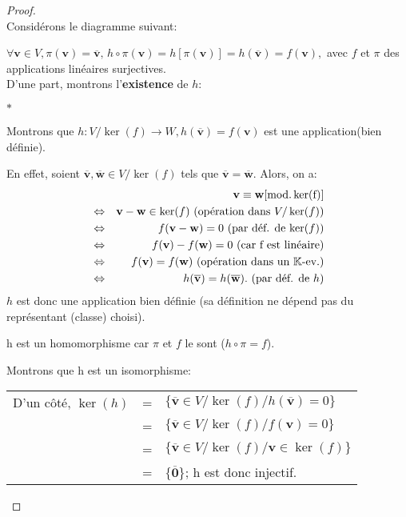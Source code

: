 \documentclass[11pt,a4paper,oneside]{book}
\newtheorem{proof}{Démonstration}
\def\K{\mathbb K}
\def\v{\mathbf v}
\def\mo{\rm mod.}
\def\w{\mathbf w}
\newcommand{\mbf}[1]{\mathbf{#1}}
\begin{document}
\begin{proof}
	\emph{\\}
Considérons le diagramme suivant:
\begin{center}
\end{center}
$ \forall \v\in V, \pi(\v)=\overline{\v},\, h\circ \pi(\v)=h[\pi(\v)]=h(\overline{\v})=f(\v),$  avec $ f $ et $ \pi $ des applications linéaires surjectives.\\
D'une part, montrons l'\textbf{existence} de $ h $:
\begin{list}{$ \ast $}{}
\item Montrons que $ h:V/\ker(f)\longrightarrow W,h(\overline{\v})=f(\v) $ est une application(bien définie).

En effet, soient $\overline{\v},\overline{\w}\in V/\ker(f) $ tels que $ \overline{\v}=\overline{\w} $. Alors, on a:
\begin{eqnarray}
&&\v\equiv \w [\mo\ker(f)]\nonumber\\
&\Leftrightarrow&\v-\w\in \ker(f)\text{ (opération dans $ V/\ker(f) $)}\nonumber\\
&\Leftrightarrow&f(\v-\w)=0 \text{ (par déf. de $ \ker(f) $)}\nonumber\\
&\Leftrightarrow& f(\v)-f(\w)=0\text{ (car f est linéaire)}\nonumber\\
&\Leftrightarrow & f(\v)=f(\w) \text{ (opération dans un $ \K $-ev.)} \nonumber\\
& \Leftrightarrow& h(\overline{\v})=h(\overline{\w}). \text{ (par déf. de $ h $)}\nonumber
\end{eqnarray}
$ h $ est donc une application bien définie (sa définition ne dépend pas du représentant (classe) choisi).

\item
h est un homomorphisme car $ \pi $ et $ f $ le sont ($ h\circ \pi=f $).

\item Montrons que h est un isomorphisme:


 \begin{tabular}{lll}
D'un côté, $ \ker(h) $&=&$ \{\overline{\v}\in V/\ker(f)/h(\overline{\v})=0\} $\\
	&=&$ \{\overline{\v}\in V/\ker(f)/f(\v)=0\} $\\
	&=&$ \{\overline{\v}\in V/\ker(f)/\v\in\ker(f)\} $\\
	&=&$ \{\overline{\mbf{0}}\} $; h est donc injectif.\\
\end{tabular}


\end{list}
\end{proof}
\end{document}
